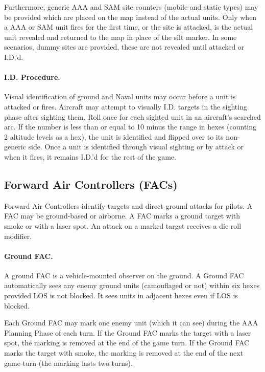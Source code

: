 Furthermore, generic AAA and SAM site counters (mobile and static types) may be provided which are placed on the map instead of the actual units. Only when a AAA or SAM unit fires for the first time, or the site is attacked, is the actual unit revealed and returned to the map in place of the silt marker. In some scenarios, dummy sites are provided, these are not revealed until attacked or I.D.'d.

\paragraph{I.D. Procedure.} Visual identification of ground and Naval units may occur before a unit is attacked or fires. Aircraft may attempt to visually I.D. targets in the sighting phase after sighting them. Roll once for each sighted unit in an aircraft's searched arc. If the number is less than or equal to 10 minus the range in hexes (counting 2 altitude levels as a hex), the unit is identified and flipped over to its non-generic side. Once a unit is identified through visual sighting or by attack or when it fires, it remains I.D.'d for the rest of the game.

\subsection{Forward Air Controllers (FACs)}

Forward Air Controllers identify targets and direct ground attacks for pilots. A FAC may be ground-based or airborne. A FAC marks a ground target with smoke or with a laser spot. An attack on a marked target receives a  die roll modifier.

\paragraph{Ground FAC.} A ground FAC is a vehicle-mounted observer on the ground. A Ground FAC automatically sees any enemy ground units (camouflaged or not) within six hexes provided LOS is not blocked. It sees units in adjacent hexes even if LOS is blocked.

Each Ground FAC may mark one enemy unit (which it can see) during the AAA Planning Phase of each turn. If the Ground FAC marks the target with a laser spot, the marking is removed at the end of the game turn. If the Ground FAC marks the target with smoke, the marking is removed at the end of the next game-turn (the marking lasts two turns).

